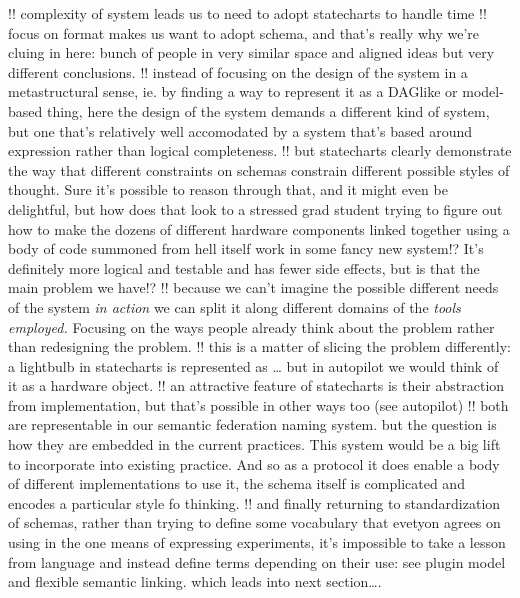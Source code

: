 \documentclass[10pt]{article}
\begin{document}
\begin{multicols}{2}
!! complexity of system leads us to need to adopt statecharts to handle
time !! focus on format makes us want to adopt schema, and that's really
why we're cluing in here: bunch of people in very similar space and
aligned ideas but very different conclusions. !! instead of focusing on
the design of the system in a metastructural sense, ie. by finding a way
to represent it as a DAGlike or model-based thing, here the design of
the system demands a different kind of system, but one that's relatively
well accomodated by a system that's based around expression rather than
logical completeness. !! but statecharts clearly demonstrate the way
that different constraints on schemas constrain different possible
styles of thought. Sure it's possible to reason through that, and it
might even be delightful, but how does that look to a stressed grad
student trying to figure out how to make the dozens of different
hardware components linked together using a body of code summoned from
hell itself work in some fancy new system!? It's definitely more logical
and testable and has fewer side effects, but is that the main problem we
have!? !! because we can't imagine the possible different needs of the
system \emph{in action} we can split it along different domains of the
\emph{tools employed.} Focusing on the ways people already think about
the problem rather than redesigning the problem. !! this is a matter of
slicing the problem differently: a lightbulb in statecharts is
represented as \ldots{} but in autopilot we would think of it as a
hardware object. !! an attractive feature of statecharts is their
abstraction from implementation, but that's possible in other ways too
(see autopilot) !! both are representable in our semantic federation
naming system. but the question is how they are embedded in the current
practices. This system would be a big lift to incorporate into existing
practice. And so as a protocol it does enable a body of different
implementations to use it, the schema itself is complicated and encodes
a particular style fo thinking. !! and finally returning to
standardization of schemas, rather than trying to define some vocabulary
that evetyon agrees on using in the one means of expressing experiments,
it's impossible to take a lesson from language and instead define terms
depending on their use: see plugin model and flexible semantic linking.
which leads into next section\ldots.


\end{multicols}
\end{document}
